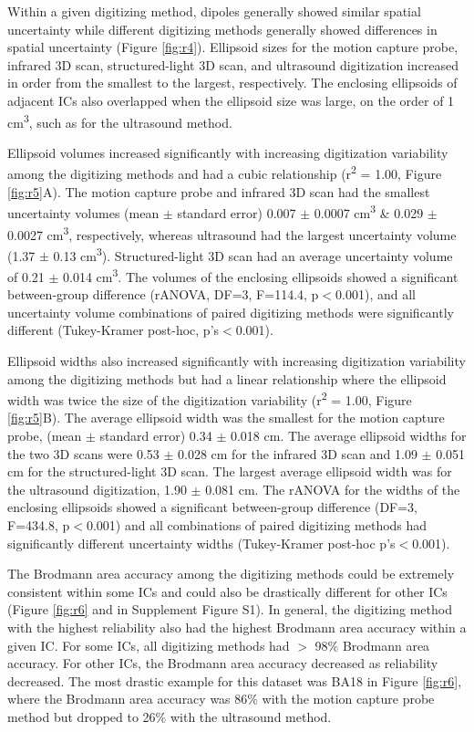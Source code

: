 \documentclass{UCF_ETD}
\newcommand{\tss}[1]{\textsuperscript{#1}}
\renewcommand{\ul}{}
\begin{document}
Within a given digitizing method, dipoles generally showed similar spatial uncertainty while different digitizing methods generally showed differences in spatial uncertainty (Figure \ref{fig:r4}). Ellipsoid sizes for the motion capture probe, infrared 3D scan, structured-light 3D scan, and ultrasound digitization increased in order from the smallest to the largest, respectively. The enclosing ellipsoids of adjacent ICs also overlapped when the ellipsoid size was large, on the order of 1 cm\tss{3}, such as for the ultrasound method. 

Ellipsoid volumes increased significantly with increasing digitization variability among the digitizing methods and had a cubic relationship (r\tss{2} = 1.00, Figure \ref{fig:r5}A). The motion capture probe and infrared 3D scan had the smallest uncertainty volumes (mean $\pm$ standard error) 0.007 $\pm$ 0.0007 cm\tss{3} \& 0.029 $\pm$ 0.0027 cm\tss{3}, respectively, whereas ultrasound had the largest uncertainty volume (1.37 $\pm$ 0.13 cm\tss{3}). Structured-light 3D scan had an average uncertainty volume of 0.21 $\pm$ 0.014 cm\tss{3}. The volumes of the enclosing ellipsoids showed a significant between-group difference (rANOVA, \ul{DF=3, F=114.4,} p$<$0.001), and all uncertainty volume combinations of paired digitizing methods were significantly different (Tukey-Kramer post-hoc, p's$<$0.001). 

Ellipsoid widths also increased significantly with increasing digitization variability among the digitizing methods but had a linear relationship where the ellipsoid width was twice the size of the digitization variability (r\tss{2} = 1.00, Figure \ref{fig:r5}B). The average ellipsoid width was the smallest for the motion capture probe, (mean $\pm$ standard error) 0.34 $\pm$ 0.018 cm. The average ellipsoid widths for the two 3D scans were 0.53 $\pm$ 0.028 cm for the infrared 3D scan and 1.09 $\pm$ 0.051 cm for the structured-light 3D scan. The largest average ellipsoid width was for the ultrasound digitization, 1.90 $\pm$ 0.081 cm. The rANOVA for the widths of the enclosing ellipsoids showed a significant between-group difference (\ul{DF=3, F=434.8}, p$<$0.001) and all combinations of paired digitizing methods had significantly different uncertainty widths (Tukey-Kramer post-hoc p's$<$0.001).

The Brodmann area accuracy among the digitizing methods could be extremely consistent within some ICs and could also be drastically different for other ICs (Figure \ref{fig:r6} and in Supplement Figure S1). In general, the digitizing method with the highest reliability also had the highest Brodmann area accuracy within a given IC. For some ICs, all digitizing methods had $>$ 98\% Brodmann area accuracy. For other ICs, the Brodmann area accuracy decreased as reliability decreased. The most drastic example for this dataset was BA18 in Figure \ref{fig:r6}, where the Brodmann area accuracy was 86\% with the motion capture probe method but dropped to 26\% with the ultrasound method.  
\end{document}

